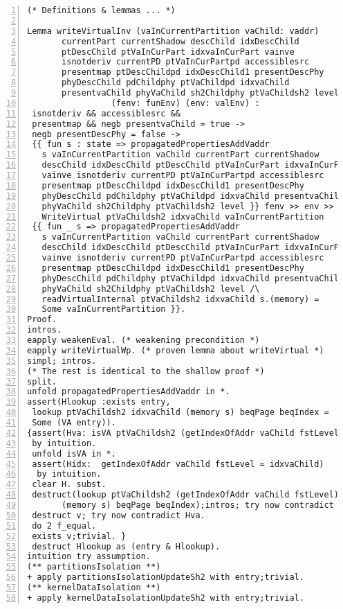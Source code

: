 \begin{appendices}
\begin{lstlisting}[xleftmargin=-.1\textwidth,
xrightmargin=-.1\textwidth,
mathescape=true,numbers=left]
(* Definitions & lemmas ... *)

Lemma writeVirtualInv (vaInCurrentPartition vaChild: vaddr)  
       currentPart currentShadow descChild idxDescChild 
       ptDescChild ptVaInCurPart idxvaInCurPart vainve 
       isnotderiv currentPD ptVaInCurPartpd accessiblesrc 
       presentmap ptDescChildpd idxDescChild1 presentDescPhy 
       phyDescChild pdChildphy ptVaChildpd idxvaChild 
       presentvaChild phyVaChild sh2Childphy ptVaChildsh2 level 
                 (fenv: funEnv) (env: valEnv) :
 isnotderiv && accessiblesrc && 
 presentmap && negb presentvaChild = true -> 
 negb presentDescPhy = false -> 
 {{ fun s : state => propagatedPropertiesAddVaddr 
   s vaInCurrentPartition vaChild currentPart currentShadow 
   descChild idxDescChild ptDescChild ptVaInCurPart idxvaInCurPart
   vainve isnotderiv currentPD ptVaInCurPartpd accessiblesrc 
   presentmap ptDescChildpd idxDescChild1 presentDescPhy 
   phyDescChild pdChildphy ptVaChildpd idxvaChild presentvaChild 
   phyVaChild sh2Childphy ptVaChildsh2 level }} fenv >> env >> 
   WriteVirtual ptVaChildsh2 idxvaChild vaInCurrentPartition 
 {{ fun _ s => propagatedPropertiesAddVaddr 
   s vaInCurrentPartition vaChild currentPart currentShadow 
   descChild idxDescChild ptDescChild ptVaInCurPart idxvaInCurPart
   vainve isnotderiv currentPD ptVaInCurPartpd accessiblesrc 
   presentmap ptDescChildpd idxDescChild1 presentDescPhy 
   phyDescChild pdChildphy ptVaChildpd idxvaChild presentvaChild 
   phyVaChild sh2Childphy ptVaChildsh2 level /\ 
   readVirtualInternal ptVaChildsh2 idxvaChild s.(memory) = 
   Some vaInCurrentPartition }}.
Proof.
intros.
eapply weakenEval. (* weakening precondition *)
eapply writeVirtualWp. (* proven lemma about writeVirtual *)
simpl; intros.
(* The rest is identical to the shallow proof *)
split. 
unfold propagatedPropertiesAddVaddr in *.
assert(Hlookup :exists entry, 
 lookup ptVaChildsh2 idxvaChild (memory s) beqPage beqIndex = 
 Some (VA entry)).
{assert(Hva: isVA ptVaChildsh2 (getIndexOfAddr vaChild fstLevel) s) 
 by intuition.
 unfold isVA in *.
 assert(Hidx:  getIndexOfAddr vaChild fstLevel = idxvaChild) 
  by intuition.
 clear H. subst. 
 destruct(lookup ptVaChildsh2 (getIndexOfAddr vaChild fstLevel)
       (memory s) beqPage beqIndex);intros; try now contradict Hva.
 destruct v; try now contradict Hva.
 do 2 f_equal.
 exists v;trivial. }
 destruct Hlookup as (entry & Hlookup).
intuition try assumption.
(** partitionsIsolation **)
+ apply partitionsIsolationUpdateSh2 with entry;trivial.
(** kernelDataIsolation **)
+ apply kernelDataIsolationUpdateSh2 with entry;trivial.

\end{lstlisting}
\end{appendices}
